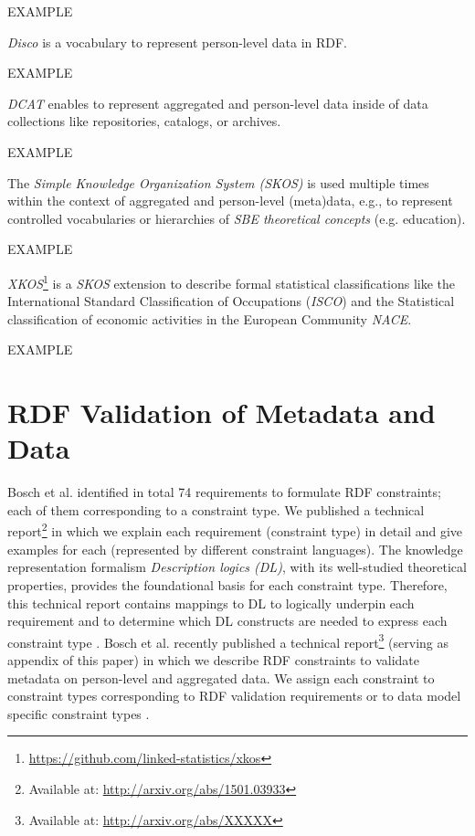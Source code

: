 \documentclass{llncs}
\begin{document}
\begin{ex}
EXAMPLE
\end{ex}

\emph{Disco} is a vocabulary to represent person-level data in RDF.

\begin{ex}
EXAMPLE
\end{ex}

\emph{DCAT} enables to represent aggregated and person-level data inside of data collections like repositories, catalogs, or archives. 

\begin{ex}
EXAMPLE
\end{ex}

The \emph{Simple Knowledge Organization System (SKOS)} is used multiple times within the context of aggregated and person-level (meta)data, e.g., to represent controlled vocabularies or hierarchies of \emph{SBE theoretical concepts} (e.g. education).

\begin{ex}
EXAMPLE
\end{ex}

\emph{XKOS}\footnote{\url{https://github.com/linked-statistics/xkos}} is a \emph{SKOS} extension to describe formal statistical classifications like the International Standard Classification of Occupations (\emph{ISCO}) and the Statistical classification of economic activities in the European Community \emph{NACE}.

\begin{ex}
EXAMPLE
\end{ex}

\section{RDF Validation of Metadata and Data}
\label{rdf-validation}

Bosch et al. identified in total 74 requirements to formulate RDF constraints; each of them corresponding to a constraint type. 
We published a technical report\footnote{Available at: \url{http://arxiv.org/abs/1501.03933}} in which we explain each requirement (constraint type) in detail and give examples for each (represented by different constraint languages).
The knowledge representation formalism \emph{Description logics (DL)}, with its  well-studied theoretical properties, provides the foundational basis for each constraint type.
Therefore, this technical report contains mappings to DL to logically underpin each requirement and to determine which DL constructs are needed to express each constraint type \cite{BoschNolleAcarEckert2015}.
Bosch et al. recently published a technical report\footnote{Available at: \url{http://arxiv.org/abs/XXXXX}} (serving as appendix of this paper) in which we describe RDF constraints to validate metadata on person-level and aggregated data.
We assign each constraint to constraint types corresponding to RDF validation requirements or to data model specific constraint types
\cite{BoschZapilkoWackerowEckert2015}.
\end{document}
